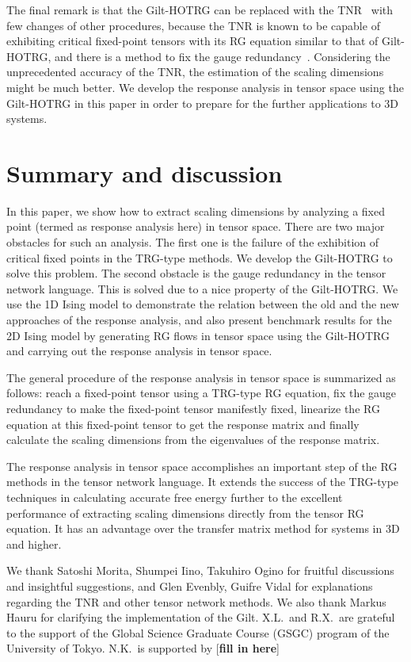 \documentclass[aps,prb,reprint,superscriptaddress]{revtex4-2}
\begin{document}
The final remark is that the Gilt-HOTRG can be replaced with
the TNR~\cite{tnr,tnralgo} with few changes of other procedures, because
the TNR is known to be capable of exhibiting critical fixed-point
tensors with its RG equation similar to that of Gilt-HOTRG, and there is
a method to fix the gauge redundancy~\cite{tnralgo}. Considering the
unprecedented accuracy of the TNR, the estimation of the scaling dimensions
might be much better. We develop the response analysis in tensor space
using the Gilt-HOTRG in this paper in order to prepare for the further
applications to 3D systems.
%


\section{Summary and discussion\label{conclusion}}
In this paper, we show how to extract scaling dimensions by analyzing a
fixed point (termed as response analysis here) in tensor space. There are two
major obstacles for such an analysis. The first one is the failure of
the exhibition of critical fixed points in the TRG-type methods. We develop
the Gilt-HOTRG to solve this problem. The second obstacle is the
gauge redundancy in the tensor network language. This is solved due to a
nice property of the Gilt-HOTRG.  We use the 1D Ising model to demonstrate
the relation between the old and the new approaches of the response
analysis, and also present benchmark results for the 2D Ising model
by generating RG flows in tensor space using the Gilt-HOTRG and carrying out
the response analysis in tensor space. 
%

The general procedure of the response analysis in tensor space is summarized
as follows: reach a fixed-point tensor using a TRG-type RG equation, fix
the gauge redundancy to make the fixed-point tensor manifestly fixed,
linearize the RG equation at this fixed-point tensor to get the response
matrix and finally calculate the scaling dimensions from the
eigenvalues of the response matrix.
%

The response analysis in tensor space accomplishes an important step of
the RG methods in the tensor network language. It extends the success of
the TRG-type techniques in calculating accurate free energy further to
the excellent performance of extracting scaling dimensions directly from
the tensor RG equation. It has an advantage over the transfer matrix
method for systems in 3D and higher. 




\begin{acknowledgments}
We thank Satoshi Morita, Shumpei Iino, Takuhiro Ogino for fruitful
discussions and insightful suggestions, and Glen Evenbly, Guifre Vidal
for explanations regarding the TNR and other tensor network methods. We
also thank Markus Hauru for clarifying the implementation of the Gilt.
X.L.\ and R.X.\ are grateful to the support of the Global Science
Graduate Course (GSGC) program of the University of Tokyo. N.K.\ is
supported by [\textbf{fill in here}]

\end{acknowledgments}
\end{document}

